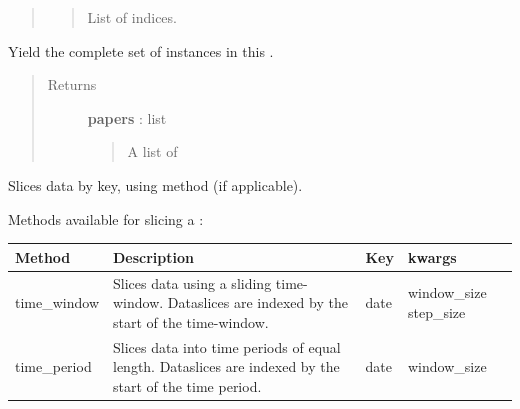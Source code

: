 \documentclass[letterpaper,10pt,english]{sphinxmanual}
\begin{document}
\begin{fulllineitems}
\begin{fulllineitems}
\begin{quote}
\begin{description}
\begin{quote}
List of indices.
\end{quote}

\end{description}\end{quote}

\end{fulllineitems}


\begin{fulllineitems}
\label{tethne:tethne.data.DataCollection.papers}
Yield the complete set of {\hyperref[tethne:tethne.data.Paper]{}} instances in this
{\hyperref[tethne:tethne.data.DataCollection]{}} .
\begin{quote}\begin{description}
\item[{Returns }] \leavevmode
\textbf{papers} : list
\begin{quote}

A list of {\hyperref[tethne:tethne.data.Paper]{}}
\end{quote}

\end{description}\end{quote}

\end{fulllineitems}


\begin{fulllineitems}
\label{tethne:tethne.data.DataCollection.slice}
Slices data by key, using method (if applicable).

Methods available for slicing a {\hyperref[tethne:tethne.data.DataCollection]{}}:

\begin{tabulary}{\linewidth}{|L|L|L|L|}
\hline
\textbf{
Method
} & \textbf{
Description
} & \textbf{
Key
} & \textbf{
kwargs
}\\\hline

time\_window
 & 
Slices data using a sliding
time-window. Dataslices are
indexed by the start of the
time-window.
 & 
date
 & 
window\_size
step\_size
\\\hline

time\_period
 & 
Slices data into time periods
of equal length. Dataslices
are indexed by the start of
the time period.
 & 
date
 & 
window\_size
\\\hline
\end{tabulary}



\end{fulllineitems}
\end{fulllineitems}
\end{document}
